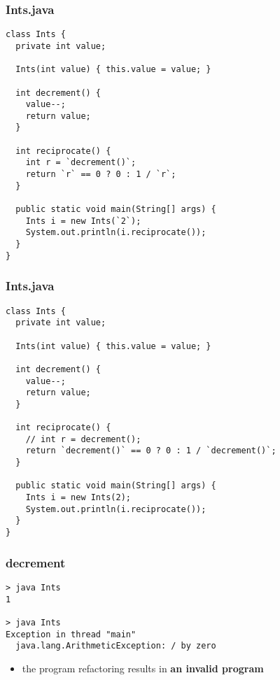 \begin{frame}[fragile]
\frametitle{Ints.java}
\begin{lstlisting}[style=java]
class Ints {
  private int value;

  Ints(int value) { this.value = value; }

  int decrement() {
    value--;
    return value;
  }

  int reciprocate() {
    int r = `decrement()`;
    return `r` == 0 ? 0 : 1 / `r`;
  }

  public static void main(String[] args) {
    Ints i = new Ints(`2`);
    System.out.println(i.reciprocate());
  }
}
\end{lstlisting}
\end{frame}

\begin{frame}[fragile]
\frametitle{Ints.java}
\begin{lstlisting}[style=java]
class Ints {
  private int value;

  Ints(int value) { this.value = value; }

  int decrement() {
    value--;
    return value;
  }

  int reciprocate() {
    // int r = decrement();
    return `decrement()` == 0 ? 0 : 1 / `decrement()`;
  }

  public static void main(String[] args) {
    Ints i = new Ints(2);
    System.out.println(i.reciprocate());
  }
}
\end{lstlisting}
\end{frame}

\begin{frame}[fragile]
\frametitle{decrement}
\begin{block}{}
\begin{lstlisting}
> java Ints
1

> java Ints
Exception in thread "main"
  java.lang.ArithmeticException: / by zero
\end{lstlisting}
\end{block}
\begin{itemize}
  \item<1> the program refactoring results in \textbf{an invalid program}
\end{itemize}
\end{frame}